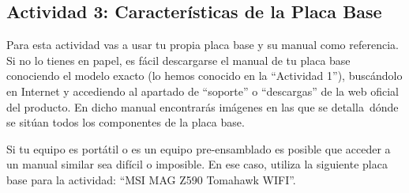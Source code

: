 \subsection{Actividad 3: Características de la Placa Base}
Para esta actividad vas a usar tu propia placa base y su manual como referencia. Si no lo tienes en papel, es fácil descargarse el manual de tu placa base conociendo el modelo exacto (lo hemos conocido en la ``Actividad 1''), buscándolo en Internet y accediendo al apartado de ``soporte'' o ``descargas'' de la web oficial del producto. En dicho manual encontrarás imágenes en las que se detalla dónde se sitúan todos los componentes de la placa base.

Si tu equipo es portátil o es un equipo pre-ensamblado es posible que acceder a un manual similar sea difícil o imposible. En ese caso, utiliza la siguiente placa base para la actividad: ``MSI MAG Z590 Tomahawk WIFI''.

